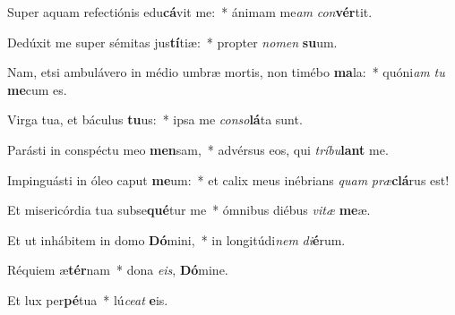 \item Super aquam refectiónis edu\textbf{cá}vit me:~* ánimam me\textit{am} \textit{con}\textbf{vér}tit.

\item Dedúxit me super sémitas jus\textbf{tí}tiæ:~* propter \textit{no}\textit{men} \textbf{su}um.

\item Nam, etsi ambulávero in médio umbræ mortis, non timébo \textbf{ma}la:~* quóni\textit{am} \textit{tu} \textbf{me}cum es.

\item Virga tua, et báculus \textbf{tu}us:~* ipsa me \textit{con}\textit{so}\textbf{lá}ta sunt.

\item Parásti in conspéctu meo \textbf{men}sam,~* advérsus eos, qui \textit{trí}\textit{bu}\textbf{lant} me.

\item Impinguásti in óleo caput \textbf{me}um:~* et calix meus inébrians \textit{quam} \textit{præ}\textbf{clá}rus est!

\item Et misericórdia tua subse\textbf{qué}tur me~* ómnibus diébus \textit{vi}\textit{tæ} \textbf{me}æ.

\item Et ut inhábitem in domo \textbf{Dó}mini,~* in longitúdi\textit{nem} \textit{di}\textbf{é}rum.

\item Réquiem æ\textbf{tér}nam~* dona \textit{e}\textit{is}, \textbf{Dó}mine.

\item Et lux per\textbf{pé}tua~* lú\textit{ce}\textit{at} \textbf{e}is.